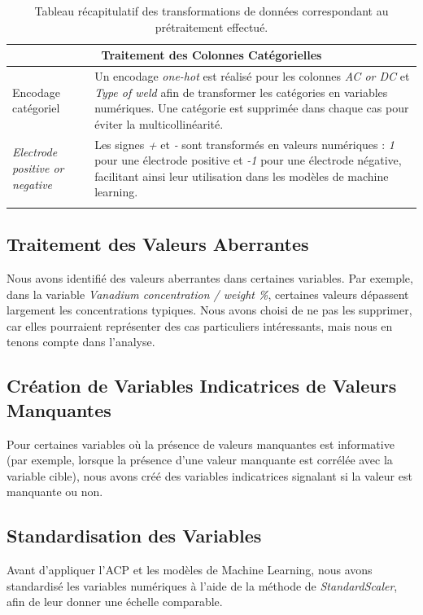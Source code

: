 \documentclass{article}
\begin{document}
\begin{longtable}{|p{4cm}|p{10cm}|}
\multicolumn{2}{|c|}{\textbf{Traitement des Colonnes Catégorielles}} \\ \hline
Encodage catégoriel & Un encodage \textit{one-hot} est réalisé pour les colonnes \textit{AC or DC} et \textit{Type of weld} afin de transformer les catégories en variables numériques. Une catégorie est supprimée dans chaque cas pour éviter la multicollinéarité. \\ \hline
\textit{Electrode positive or negative} & Les signes \textit{+} et \textit{-} sont transformés en valeurs numériques : \textit{1} pour une électrode positive et \textit{-1} pour une électrode négative, facilitant ainsi leur utilisation dans les modèles de machine learning. \\ \hline

\caption{Tableau récapitulatif des transformations de données correspondant au prétraitement effectué.}
\end{longtable}
\subsection{Traitement des Valeurs Aberrantes}

Nous avons identifié des valeurs aberrantes dans certaines variables. Par exemple, dans la variable \textit{Vanadium concentration / weight \%}, certaines valeurs dépassent largement les concentrations typiques. Nous avons choisi de ne pas les supprimer, car elles pourraient représenter des cas particuliers intéressants, mais nous en tenons compte dans l'analyse.

\subsection{Création de Variables Indicatrices de Valeurs Manquantes}

Pour certaines variables où la présence de valeurs manquantes est informative (par exemple, lorsque la présence d'une valeur manquante est corrélée avec la variable cible), nous avons créé des variables indicatrices signalant si la valeur est manquante ou non.

\subsection{Standardisation des Variables}

Avant d'appliquer l'ACP et les modèles de Machine Learning, nous avons standardisé les variables numériques à l'aide de la méthode de \textit{StandardScaler}, afin de leur donner une échelle comparable.
\end{document}
